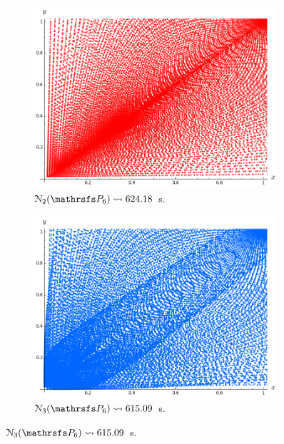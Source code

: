 \documentclass{beamer}
\begin{document}
\begin{frame}
\begin{figure}
\begin{subfigure}{.38\linewidth}\centering
\includegraphics[width=1\textwidth]{plots/ch5_new2_P6.png}
\vspace{-0.1cm}\caption{$\mathcal{N}_2(\PP_6)\leadsto 624.18$ s.}
\end{subfigure}
\hspace{0.8cm}
\begin{subfigure}{.38\linewidth}\centering
\includegraphics[width=1\textwidth]{plots/ch5_new3_P6.png}
\vspace{-0.1cm}\caption{$\mathcal{N}_3(\PP_6)\leadsto 615.09$ s.}
\end{subfigure}
\end{figure}
\end{frame}
\end{document}
